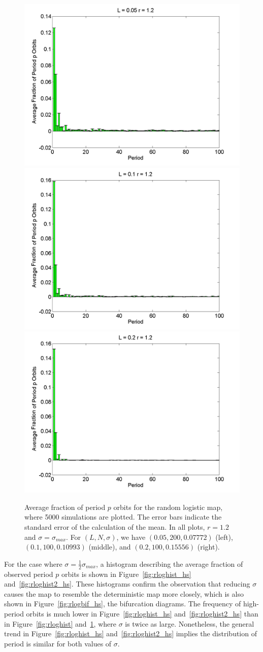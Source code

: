 \begin{figure}[H]\linespread{1}
\caption[Average fraction of period $p$ orbits for the random logistic
map, $\sigma=\sigma_{max}$ and $r=1.2$]{Average fraction of period $p$ orbits for the random logistic
map, where 5000 simulations are plotted. The error bars indicate
the standard error of the calculation of the mean. In all plots,
$r=1.2$ and $\sigma=\sigma_{max}$. For $(L,N,\sigma)$,
we have $(0.05, 200, 0.07772)$ (left), $(0.1, 100, 0.10993)$
(middle), and $(0.2, 100, 0.15556)$ (right).}\label{fig:rloghist2}
	\begin{center}	\includegraphics[width=.33\textwidth]{figs/rlog_hist_L_005_r_12_s_007772_a_000015098_sims_5000.png}\hfill
\includegraphics[width=.33\textwidth]{figs/rlog_hist_L_01_r_12_s_010993_a_000060373_sims_5000.png}\hfill	
\includegraphics[width=.33\textwidth]{figs/rlog_hist_L_02_r_12_s_015556_a_00024119_sims_5000.png}
	\end{center}
\end{figure}

For the case where $\sigma = \frac{1}{2}\sigma_{max}$, a histogram describing the average fraction of observed period $p$
orbits is shown in Figure~\ref{fig:rloghist_hs}
and~\ref{fig:rloghist2_hs}. These histograms confirm the observation
that reducing $\sigma$ causes the map to resemble the deterministic
map more closely, which is also shown in Figure~\ref{fig:rlogbif_hs},
the bifurcation diagrams. The frequency of high-period orbits is much
lower in Figure~\ref{fig:rloghist_hs} and~\ref{fig:rloghist2_hs} than
in Figure~\ref{fig:rloghist} and~\ref{fig:rloghist2}, where
$\sigma$ is twice as large. Nonetheless, the general trend in Figure~\ref{fig:rloghist_hs}
and~\ref{fig:rloghist2_hs} implies the distribution of period is
similar for both values of $\sigma$.


